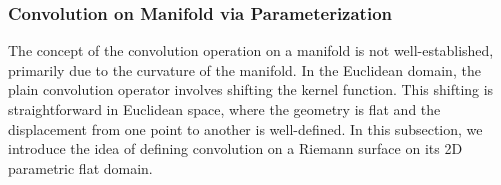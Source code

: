 
\subsubsection{Convolution on Manifold via Parameterization}

The concept of the convolution operation on a manifold is not well-established, primarily due to the curvature of the manifold. In the Euclidean domain, the plain convolution operator involves shifting the kernel function. This shifting is straightforward in Euclidean space, where the geometry is flat and the displacement from one point to another is well-defined. In this subsection, we introduce the idea of defining convolution on a Riemann surface on its 2D parametric flat domain.

